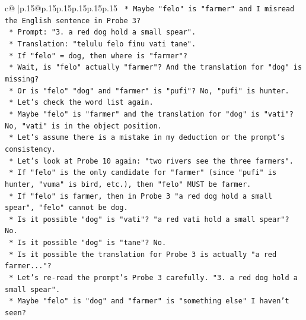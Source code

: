 \documentclass{article}
\begin{document}
{\begin{supertabular}{c@{$\;$}|p{.15\linewidth}@{}p{.15\linewidth}p{.15\linewidth}p{.15\linewidth}p{.15\linewidth}p{.15\linewidth}}
{{{\texttt{                                    *   Maybe "felo" is "farmer" and I misread the English sentence in Probe 3?} \\
\texttt{                                    *   Prompt: "3. a red dog hold a small spear".} \\
\texttt{                                    *   Translation: "telulu felo finu vati tane".} \\
\texttt{                                    *   If "felo" = dog, then where is "farmer"?} \\
\texttt{                                    *   Wait, is "felo" actually "farmer"? And the translation for "dog" is missing?} \\
\texttt{                                    *   Or is "felo" "dog" and "farmer" is "pufi"? No, "pufi" is hunter.} \\
\texttt{                                    *   Let's check the word list again.} \\
\texttt{                                    *   Maybe "felo" is "farmer" and the translation for "dog" is "vati"? No, "vati" is in the object position.} \\
\texttt{                                    *   Let's assume there is a mistake in my deduction or the prompt's consistency.} \\
\texttt{                                    *   Let's look at Probe 10 again: "two rivers see the three farmers".} \\
\texttt{                                    *   If "felo" is the only candidate for "farmer" (since "pufi" is hunter, "vuma" is bird, etc.), then "felo" MUST be farmer.} \\
\texttt{                                    *   If "felo" is farmer, then in Probe 3 "a red dog hold a small spear", "felo" cannot be dog.} \\
\texttt{                                    *   Is it possible "dog" is "vati"? "a red vati hold a small spear"? No.} \\
\texttt{                                    *   Is it possible "dog" is "tane"? No.} \\
\texttt{                                    *   Is it possible the translation for Probe 3 is actually "a red farmer..."?} \\
\texttt{                                    *   Let's re{-}read the prompt's Probe 3 carefully. "3. a red dog hold a small spear".} \\
\texttt{                                    *   Maybe "felo" is "dog" and "farmer" is "something else" I haven't seen?} \\
}}}
\end{supertabular}}
\end{document}
